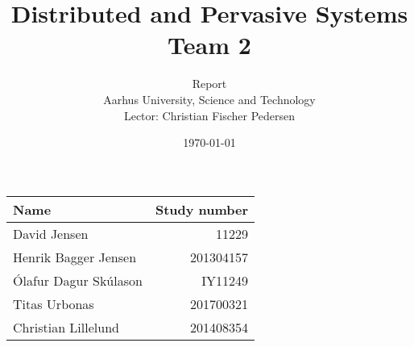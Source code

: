 \documentclass[a4paper,10pt,oneside]{memoir}
\title{Distributed and Pervasive Systems \\ Team 2}
\author{Report \\ Aarhus University, Science and Technology \\ Lector: Christian Fischer Pedersen}
\date{\today}
\begin{document}
\fancyhf{} %
\frontmatter
\maketitle
\vfill


\begin{table} [h]
	\centering
	\begin{tabular}{|l|r|}
	\hline 
	\textbf{Name} 				& \textbf{Study number}	\\ \hline
	David Jensen 				& 11229 	  			\\ \hline
	Henrik Bagger Jensen 		& 201304157  			\\ \hline
	Ólafur Dagur Skúlason 		& IY11249	 			\\ \hline
	Titas Urbonas 				& 201700321  			\\ \hline
	Christian Lillelund 		& 201408354 			\\ \hline

	\end{tabular}
\end{table}

\vfill

\clearpage
\pagestyle{plain}

\tableofcontents

\vfill

\mainmatter
\pagestyle{fancy}
\fancyhf{} %
\fancyhead[CE,CO]{\nouppercase{\leftmark}}
\fancyfoot[CO,CE]{\nouppercase{\rightmark}}
\fancyfoot[LE,RO]{\thepage}

				\clearpage
	\clearpage
		\clearpage
		\clearpage
					\clearpage
				\clearpage
			\clearpage
			\clearpage
				\clearpage
				    \clearpage
				    \clearpage
				\clearpage
				\clearpage

\end{document}
